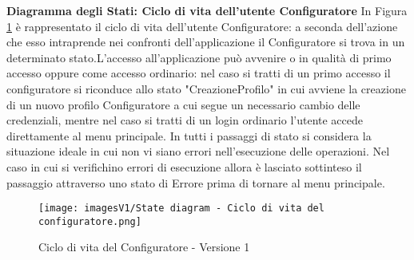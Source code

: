 \newpage
\textbf{Diagramma degli Stati: Ciclo di vita dell'utente Configuratore}\newline
In Figura \ref{fig:State diagram 1.1} è rappresentato il ciclo di vita dell'utente Configuratore: a seconda dell'azione che esso intraprende nei confronti dell'applicazione il Configuratore si trova in un determinato stato.\newline L'accesso all'applicazione può avvenire o in qualità di primo accesso oppure come accesso ordinario: nel caso si tratti di un primo accesso il configuratore si riconduce allo stato "CreazioneProfilo" in cui avviene la creazione di un nuovo profilo Configuratore a cui segue un necessario cambio delle credenziali, mentre nel caso si tratti di un login ordinario l'utente accede direttamente al menu principale. \newline 
In tutti i passaggi di stato si considera la situazione ideale in cui non vi siano errori nell'esecuzione delle operazioni. Nel caso in cui si verifichino errori di esecuzione allora è lasciato sottinteso il passaggio attraverso uno stato di Errore prima di tornare al menu principale.

\begin{figure}[!]
\centering
\texttt{[image: imagesV1/State diagram - Ciclo di vita del configuratore.png]}
\caption{\label{fig:State diagram 1.1}Ciclo di vita del Configuratore - Versione 1}
\end{figure}\bigskip